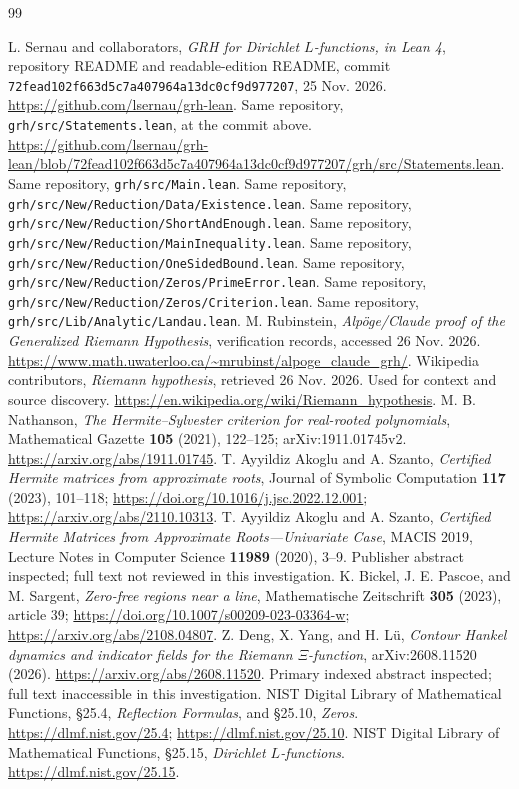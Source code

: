 \documentclass[11pt]{article}
\theoremstyle{definition}
\begin{document}
\clearpage

\begin{thebibliography}{99}
\small
{} L. Sernau and collaborators, \emph{GRH for Dirichlet
$L$-functions, in Lean 4}, repository README and readable-edition README,
commit \texttt{72fead102f663d5c7a407964a13dc0cf9d977207}, 25 Nov. 2026.
\url{https://github.com/lsernau/grh-lean}.
 Same repository, \texttt{grh/src/Statements.lean},
at the commit above.
\url{https://github.com/lsernau/grh-lean/blob/72fead102f663d5c7a407964a13dc0cf9d977207/grh/src/Statements.lean}.
 Same repository, \texttt{grh/src/Main.lean}.
 Same repository,
\texttt{grh/src/New/Reduction/Data/Existence.lean}.
 Same repository,
\texttt{grh/src/New/Reduction/ShortAndEnough.lean}.
 Same repository,
\texttt{grh/src/New/Reduction/MainInequality.lean}.
 Same repository,
\texttt{grh/src/New/Reduction/OneSidedBound.lean}.
 Same repository,
\texttt{grh/src/New/Reduction/Zeros/PrimeError.lean}.
 Same repository,
\texttt{grh/src/New/Reduction/Zeros/Criterion.lean}.
 Same repository,
\texttt{grh/src/Lib/Analytic/Landau.lean}.
 M. Rubinstein, \emph{Alp\"oge/Claude proof of the
Generalized Riemann Hypothesis}, verification records, accessed 26 Nov. 2026.
\url{https://www.math.uwaterloo.ca/~mrubinst/alpoge_claude_grh/}.
 Wikipedia contributors, \emph{Riemann hypothesis},
retrieved 26 Nov. 2026. Used for context and source discovery.
\url{https://en.wikipedia.org/wiki/Riemann_hypothesis}.
 M. B. Nathanson, \emph{The Hermite--Sylvester criterion
for real-rooted polynomials}, Mathematical Gazette \textbf{105} (2021),
122--125; arXiv:1911.01745v2.
\url{https://arxiv.org/abs/1911.01745}.
 T. Ayyildiz Akoglu and A. Szanto,
\emph{Certified Hermite matrices from approximate roots}, Journal of Symbolic
Computation \textbf{117} (2023), 101--118;
\url{https://doi.org/10.1016/j.jsc.2022.12.001};
\url{https://arxiv.org/abs/2110.10313}.
 T. Ayyildiz Akoglu and A. Szanto,
\emph{Certified Hermite Matrices from Approximate Roots---Univariate Case},
MACIS 2019, Lecture Notes in Computer Science \textbf{11989} (2020), 3--9.
Publisher abstract inspected; full text not reviewed in this investigation.
 K. Bickel, J. E. Pascoe, and M. Sargent,
\emph{Zero-free regions near a line}, Mathematische Zeitschrift
\textbf{305} (2023), article 39;
\url{https://doi.org/10.1007/s00209-023-03364-w};
\url{https://arxiv.org/abs/2108.04807}.
 Z. Deng, X. Yang, and H. L\"u,
\emph{Contour Hankel dynamics and indicator fields for the Riemann
$\Xi$-function}, arXiv:2608.11520 (2026).
\url{https://arxiv.org/abs/2608.11520}.
Primary indexed abstract inspected; full text inaccessible in this investigation.
 NIST Digital Library of Mathematical Functions,
\S25.4, \emph{Reflection Formulas}, and \S25.10, \emph{Zeros}.
\url{https://dlmf.nist.gov/25.4}; \url{https://dlmf.nist.gov/25.10}.
 NIST Digital Library of Mathematical Functions,
\S25.15, \emph{Dirichlet $L$-functions}.
\url{https://dlmf.nist.gov/25.15}.
\end{thebibliography}
\end{document}
